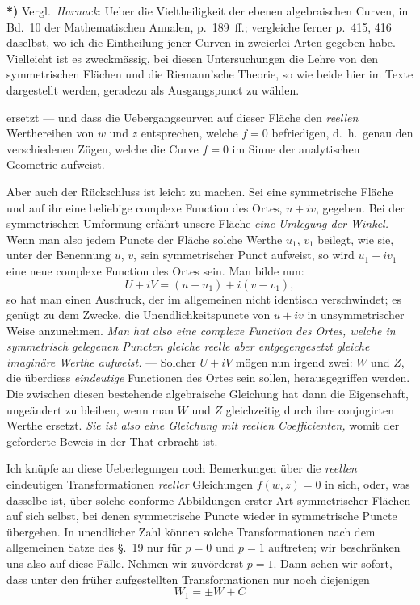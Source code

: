 \documentclass{article}
\begin{document}
\textbf{*)} Vergl.\ \emph{Harnack}: Ueber die Vieltheiligkeit der ebenen algebraischen Curven, in Bd.~10 der Mathematischen Annalen, p.~189~ff.; vergleiche ferner p.~415, 416 daselbst, wo ich die Eintheilung jener Curven in zweierlei Arten gegeben habe. Vielleicht ist es zweckmässig, bei diesen Untersuchungen die Lehre von den symmetrischen Flächen und die Riemann'sche Theorie, so wie beide hier im Texte dargestellt werden, geradezu als Ausgangspunct zu wählen.

ersetzt --- und dass die Uebergangscurven auf dieser Fläche den \emph{reellen} Werthereihen von $w$ und $z$ entsprechen, welche $f = 0$ befriedigen, d.\ h.\ genau den verschiedenen Zügen, welche die Curve $f = 0$ im Sinne der analytischen Geometrie aufweist.

Aber auch der Rückschluss ist leicht zu machen. Sei eine symmetrische Fläche und auf ihr eine beliebige complexe Function des Ortes, $u + iv$, gegeben. Bei der symmetrischen Umformung erfährt unsere Fläche \emph{eine Umlegung der Winkel.} Wenn man also jedem Puncte der Fläche solche Werthe $u_{1}$, $v_{1}$ beilegt, wie sie, unter der Benennung $u$, $v$, sein symmetrischer Punct aufweist, so wird $u_{1} - iv_{1}$ eine neue complexe Function des Ortes sein. Man bilde nun:
\[ U + iV = (u + u_{1}) + i(v - v_{1}), \]
so hat man einen Ausdruck, der im allgemeinen nicht identisch verschwindet; es genügt zu dem Zwecke, die Unendlichkeitspuncte von $u + iv$ in unsymmetrischer Weise anzunehmen. \emph{Man hat also eine complexe Function des Ortes, welche in symmetrisch gelegenen Puncten gleiche reelle aber entgegengesetzt gleiche imaginäre Werthe aufweist.} --- Solcher $U + iV$ mögen nun irgend zwei: $W$ und $Z$, die überdiess \emph{eindeutige} Functionen des Ortes sein sollen, herausgegriffen werden. Die zwischen diesen bestehende algebraische Gleichung hat dann die Eigenschaft, ungeändert zu bleiben, wenn man $W$ und $Z$ gleichzeitig durch ihre conjugirten Werthe ersetzt. \emph{Sie ist also eine Gleichung mit reellen Coefficienten,} womit der geforderte Beweis in der That erbracht ist.

Ich knüpfe an diese Ueberlegungen noch Bemerkungen über die \emph{reellen} eindeutigen Transformationen \emph{reeller} Gleichungen $f(w, z) = 0$ in sich, oder, was dasselbe ist, über solche conforme Abbildungen erster Art symmetrischer Flächen auf sich selbst, bei denen symmetrische Puncte wieder in symmetrische Puncte übergehen. In unendlicher Zahl können solche Transformationen nach dem allgemeinen Satze des §.~19 nur für $p = 0$ und $p = 1$ auftreten; wir beschränken uns also auf diese Fälle. Nehmen wir zuvörderst $p = 1$. Dann sehen wir sofort, dass unter den früher aufgestellten Transformationen nur noch diejenigen
\[ W_{1} = \pm W + C \]
\end{document}
